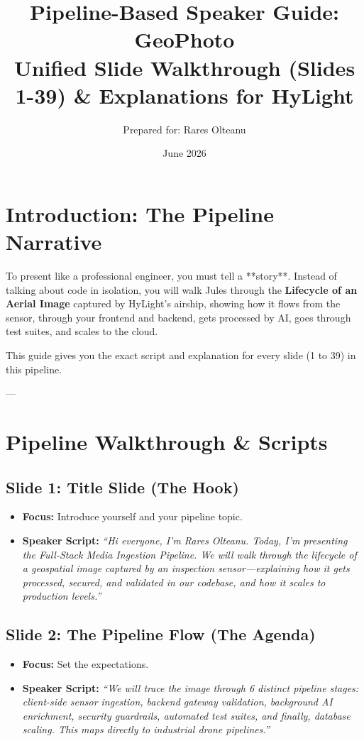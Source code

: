 \documentclass[11pt]{article}
\title{\textbf{Pipeline-Based Speaker Guide: GeoPhoto}\\
\large Unified Slide Walkthrough (Slides 1-39) \& Explanations for HyLight}
\author{Prepared for: Rares Olteanu}
\date{June 2026}
\begin{document}
\maketitle
\newpage
\tableofcontents
\newpage

\section{Introduction: The Pipeline Narrative}
To present like a professional engineer, you must tell a **story**. 
Instead of talking about code in isolation, you will walk Jules through the \textbf{Lifecycle of an Aerial Image} captured by HyLight's airship, showing how it flows from the sensor, through your frontend and backend, gets processed by AI, goes through test suites, and scales to the cloud.

This guide gives you the exact script and explanation for every slide (1 to 39) in this pipeline.

---

\section{Pipeline Walkthrough & Scripts}

\subsection{Slide 1: Title Slide (The Hook)}
\begin{itemize}
    \item \textbf{Focus:} Introduce yourself and your pipeline topic.
    \item \textbf{Speaker Script:} 
    \textit{``Hi everyone, I'm Rares Olteanu. Today, I'm presenting the Full-Stack Media Ingestion Pipeline. We will walk through the lifecycle of a geospatial image captured by an inspection sensor—explaining how it gets processed, secured, and validated in our codebase, and how it scales to production levels.''}
\end{itemize}

\subsection{Slide 2: The Pipeline Flow (The Agenda)}
\begin{itemize}
    \item \textbf{Focus:} Set the expectations.
    \item \textbf{Speaker Script:} 
    \textit{``We will trace the image through 6 distinct pipeline stages: client-side sensor ingestion, backend gateway validation, background AI enrichment, security guardrails, automated test suites, and finally, database scaling. This maps directly to industrial drone pipelines.''}
\end{itemize}
\end{document}
